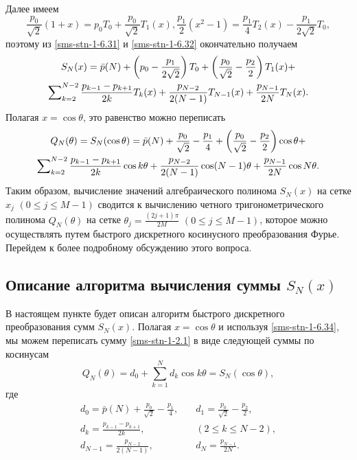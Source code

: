 Далее имеем
$$
\frac{p_0}{\sqrt{2}}(1+x)=p_0T_0+\frac{p_0}{\sqrt{2}}T_1(x), \frac{p_1}2(x^2-1)= \frac{p_1}4T_2(x) -\frac{p_1}{2\sqrt{2}}T_0,
$$
поэтому из \eqref{sms-stn-1-6.31} и  \eqref{sms-stn-1-6.32} окончательно получаем
\begin{multline}\label{sms-stn-1-6.33}
S_N(x)=\bar p(N)+\left(p_0-\frac{p_1}{2\sqrt{2}}\right)T_0+\left(\frac{p_0}{\sqrt{2}}-{p_{2}\over2}\right)T_1(x)+
\\
\sum\nolimits_{k=2}^{N-2}{p_{k-1}-p_{k+1}\over2k}T_k(x)
+{p_{N-2}\over2(N-1)}T_{N-1}(x)+{p_{N-1}\over2N}T_{N}(x).
\end{multline}
Полагая $x=\cos\theta$, это равенство можно переписать
\begin{multline}\label{sms-stn-1-6.34}
Q_N(\theta)=S_N(\cos\theta)=
\bar p(N)+\frac{p_0}{\sqrt{2}}-\frac{p_1}{4}+\left(\frac{p_0}{\sqrt{2}}-{p_{2}\over2}\right)\cos\theta+
\\
\sum\nolimits_{k=2}^{N-2}{p_{k-1}-p_{k+1}\over2k}\cos k\theta
+{p_{N-2}\over2(N-1)}\cos(N-1)\theta+{p_{N-1}\over2N}\cos N\theta.
\end{multline}
Таким образом, вычисление значений алгебраического полинома $S_N(x)$ на сетке $x_j$ $(0\le j\le M-1)$ сводится к вычислению
четного тригонометрического полинома $Q_N(\theta)$ на сетке $\theta_j=\frac{(2j+1)\pi}{2M}$ $(0\le j\le M-1)$, которое можно осуществлять путем быстрого
дискретного косинусного преобразования Фурье. Перейдем к более подробному обсуждению этого вопроса.

\subsection{Описание алгоритма вычисления суммы $S_N(x)$}

В настоящем пункте будет описан алгоритм быстрого дискретного преобразования сумм $S_N(x)$.
Полагая $x=\cos\theta$ и используя \eqref{sms-stn-1-6.34}, мы можем переписать сумму \eqref{sms-stn-1-2.1} в виде следующей суммы по косинусам
\begin{equation}\label{sms-stn-1-sobcheb12}
Q_N(\theta) =
d_{0} + \sum_{k=1}^{N}  d_{k} \cos{k\theta}=S_N(\cos\theta),
\end{equation}
где
\begin{align}
d_{0} =
\bar p(N) + \frac{ p_{0}}{\sqrt{2} }-\frac{ p_{1}}{4},
&\quad
d_{1} =
\frac{ p_{0}}{\sqrt{2}}-\frac{ p_{2}}{2},\label{sms-stn-1-sobcheb13}
\\
d_{k} =
\frac{ p_{k-1}- p_{k+1}}{2k},
&\quad(2 \leq k \leq N-2),\label{sms-stn-1-sobcheb13.1}
\\
d_{N-1} =
\frac{ p_{N-2}}{2(N-1)},
&\quad
d_{N} =
\frac{ p_{N-1}}{2N}.\label{sms-stn-1-sobcheb13.2}
\end{align}

